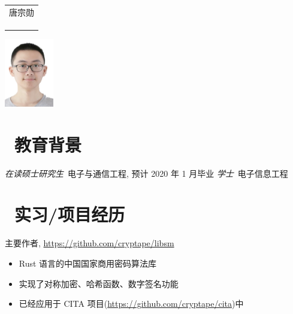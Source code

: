 \documentclass{resume}
\newcommand{\hlink}[1]{\href{#1}{#1}}
\begin{document}

\medskip\noindent
\begin{minipage}{0.7\textwidth}
  \Large{
    \begin{tabu}  { l }
      \scshape{唐宗勋} \\
       \\
       \\
       \\
    \end{tabu}
  }
\end{minipage}
\begin{minipage}{0.3\textwidth}
  \raggedleft
  \includegraphics[height=30mm]{me}
\end{minipage}

%


\section{\faGraduationCap\  教育背景}
\textit{在读硕士研究生}\ 电子与通信工程, 预计 2020 年 1 月毕业
\textit{学士}\ 电子信息工程

\section{\faUsers\ 实习/项目经历}
主要作者, \hlink{https://github.com/cryptape/libsm}
\begin{itemize}
  \item Rust 语言的中国国家商用密码算法库
  \item 实现了对称加密、哈希函数、数字签名功能
  \item 已经应用于 CITA 项目(\hlink{https://github.com/cryptape/cita})中
\end{itemize}
\end{document}
